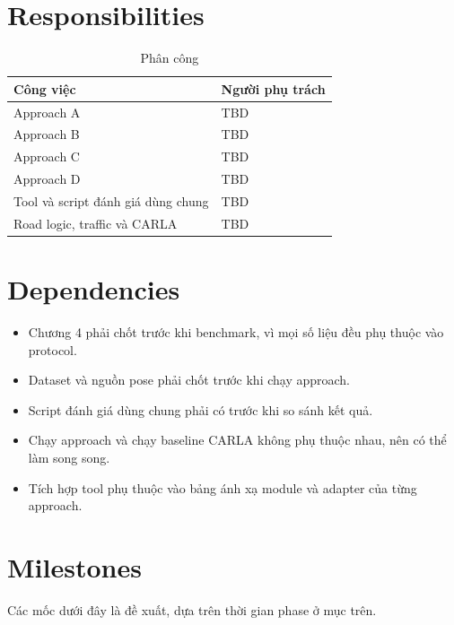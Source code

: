 \section{Responsibilities}

\begin{table}[H]
  \centering
  \caption{Phân công}
  \begin{tabularx}{\linewidth}{X l}
    \toprule
    \textbf{Công việc} & \textbf{Người phụ trách} \\
    \midrule
    Approach A & TBD \\
    Approach B & TBD \\
    Approach C & TBD \\
    Approach D & TBD \\
    Tool và script đánh giá dùng chung & TBD \\
    Road logic, traffic và CARLA & TBD \\
    \bottomrule
  \end{tabularx}
\end{table}

\section{Dependencies}

\begin{itemize}
  \item Chương 4 phải chốt trước khi benchmark, vì mọi số liệu đều phụ thuộc vào protocol.
  \item Dataset và nguồn pose phải chốt trước khi chạy approach.
  \item Script đánh giá dùng chung phải có trước khi so sánh kết quả.
  \item Chạy approach và chạy baseline CARLA không phụ thuộc nhau, nên có thể làm song song.
  \item Tích hợp tool phụ thuộc vào bảng ánh xạ module và adapter của từng approach.
\end{itemize}

\section{Milestones}

Các mốc dưới đây là đề xuất, dựa trên thời gian phase ở mục trên.

